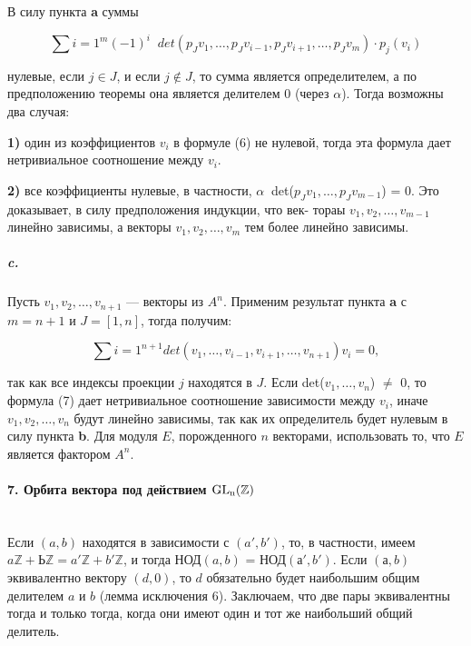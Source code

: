 {\noindent В силу пункта {\bf a} суммы

\begin{equation*}
\sum\limits {i=1}^m (-1)^i\;\;det(p_{J}v_1,\ldots,p_{J}v_{i-1},p_{J}v_{i+1},\ldots,p_{J}v_{m}) \cdot p_{j}(v_{i})
\end{equation*}

\noindent нулевые, если $j \in J$, и если $j \notin J$, то сумма является определителем, а
по предположению теоремы она является делителем 0 (через $\alpha$). Тогда
возможны два случая:

{\bf 1)} один из коэффициентов $v_{i}$ в формуле (6) не нулевой, тогда эта
формула дает нетривиальное соотношение между $v_{i}$.

{\bf 2)} все коэффициенты нулевые, в частности, $\alpha\;\;$det($p_{J}v_{1},\ldots,p_{J}v_{m-1}$)
= 0. Это доказывает, в силу предположения индукции, что век-
тораы $v_1,v_2,\ldots,v_{m-1}$ линейно зависимы, а векторы $v_1,v_2,\ldots,v_{m}$
тем более линейно зависимы.

\subparagraph{c.} Пусть $v_1,v_2,\ldots,v_{n+1}$ — векторы из $A^{n}$. Применим результат
пункта {\bf a} с $m = n + 1$ и $J = [1,n]$, тогда получим:

\begin{equation}
\sum\limits {i=1}^{n+1} det(v_1,\ldots,v_{i-1},v_{i+1},\ldots,v_{n+1})v_{i} = 0,
\end{equation}




\noindent так как все индексы проекции $j$ находятся в $J$. Если det($v_{1},\ldots,v_{n}$) $\neq$ 0, то формула (7) дает нетривиальное соотношение зависимости между $v_{i}$, иначе $v_1,v_2,\ldots,v_n$ будут линейно зависимы, так как их определитель будет нулевым в силу пункта {\bf b}. Для модуля $E$, порожденного $n$ векторами, использовать то, что $E$ является фактором $A^{n}$.

\paragraph{7. Орбита вектора под действием $\rm{GL_n}(\mathbb {Z})$} \mbox{}\\

Если $(a, b)$ находятся в зависимости с $(a',b')$, то, в частности, имеем $a\mathbb {Z}+ Ь\mathbb {Z} = a'\mathbb {Z}+ b'\mathbb {Z}$, и тогда НОД$(a,b)$ = НОД$(а',b')$. Если $(а, b)$ эквивалентно вектору $(d, 0)$, то $d$ обязательно будет наибольшим общим делителем $a$ и $b$ (лемма исключения 6). Заключаем, что две пары эквивалентны тогда и только тогда, когда они имеют один и тот же наибольший общий делитель.

}
